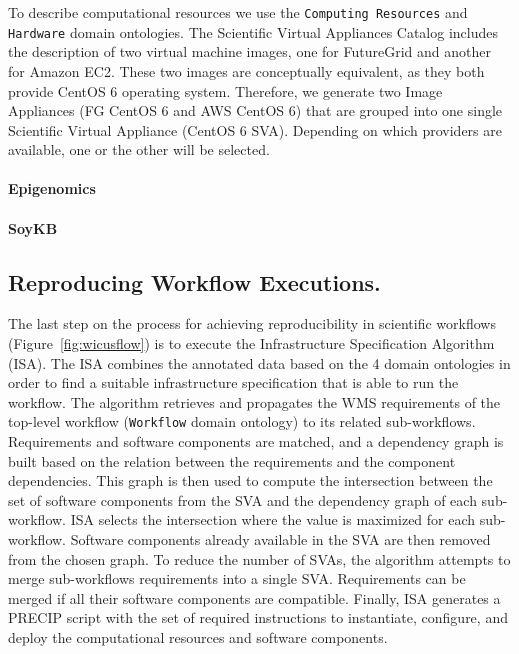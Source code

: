 To describe computational resources we use the \texttt{Computing Resources} and \texttt{Hardware} domain ontologies. The Scientific Virtual Appliances Catalog includes the description of two virtual machine images, one for FutureGrid and another for Amazon EC2. These two images are conceptually equivalent, as they both provide CentOS 6 operating system.
Therefore, we generate two Image Appliances (FG CentOS 6 and AWS CentOS 6) that are grouped into one single Scientific Virtual Appliance (CentOS 6 SVA). Depending on which providers are available, one or the other will be selected.

\paragraph{\textbf{Epigenomics}}

\paragraph{\textbf{SoyKB}}



\subsection{Reproducing Workflow Executions.}

The last step on the process for achieving reproducibility in scientific workflows (Figure~\ref{fig:wicusflow}) is to execute the Infrastructure Specification Algorithm (ISA). The ISA combines the annotated data based on the 4 domain ontologies in order to find a suitable infrastructure specification that is able to run the workflow. The algorithm retrieves and propagates the WMS requirements of the top-level workflow (\texttt{Workflow} domain ontology) to its related sub-workflows. Requirements and software components are matched, and a dependency graph is built based on the relation between the requirements and the component dependencies. This graph is then used to compute the intersection between the set of software components from the SVA and the dependency graph of each sub-workflow. ISA selects the intersection where the value is maximized for each sub-workflow. Software components already available in the SVA are then removed from the chosen graph. To reduce the number of SVAs, the algorithm attempts to merge sub-workflows requirements into a single SVA. Requirements can be merged if all their software components are compatible. Finally, ISA generates a PRECIP script with the set of required instructions to instantiate, configure, and deploy the computational resources and software components.


